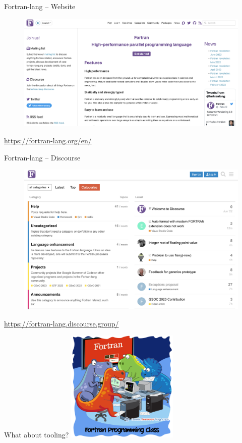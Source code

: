 \documentclass[aspectratio=169]{beamer}
\begin{document}
\begin{frame}{Fortran-lang -- Website}
    \centering
    \begin{figure}
        \includegraphics[width=.85\textwidth]{website_screenshot}
    \end{figure}
    \footnotesize\url{https://fortran-lang.org/en/}
\end{frame}

\begin{frame}{Fortran-lang -- Discourse}
\centering
    \begin{figure}
        \includegraphics[width=.65\textwidth]{Discourse_screenshot}
    \end{figure}
        \footnotesize\url{https://fortran-lang.discourse.group/}
\end{frame}

\begin{frame}{What about tooling?}
    \centering
    \includegraphics[width=0.4\textwidth]{punch-cards-hires}\\
    \vspace{2mm}\caption{Source: \url{https://comic.browserling.com/49}}
\end{frame}
\end{document}
